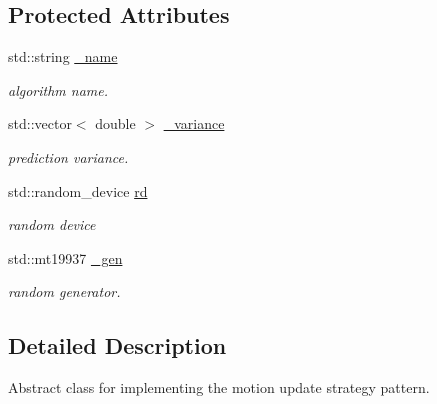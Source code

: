 \subsection*{Protected Attributes}
\begin{DoxyCompactItemize}
\item 
\hypertarget{classMotionUpdate_abbc6aa3b84948633b9f78457a8b8c350}{std\-::string \hyperlink{classMotionUpdate_abbc6aa3b84948633b9f78457a8b8c350}{\-\_\-name}}\label{classMotionUpdate_abbc6aa3b84948633b9f78457a8b8c350}

\begin{DoxyCompactList}\small\item\em algorithm name. \end{DoxyCompactList}\item 
\hypertarget{classMotionUpdate_afd6ec5a2d192392fd23a0d637cce71be}{std\-::vector$<$ double $>$ \hyperlink{classMotionUpdate_afd6ec5a2d192392fd23a0d637cce71be}{\-\_\-variance}}\label{classMotionUpdate_afd6ec5a2d192392fd23a0d637cce71be}

\begin{DoxyCompactList}\small\item\em prediction variance. \end{DoxyCompactList}\item 
\hypertarget{classMotionUpdate_aad51f40e81e60f672035f0a43bb352ad}{std\-::random\-\_\-device \hyperlink{classMotionUpdate_aad51f40e81e60f672035f0a43bb352ad}{rd}}\label{classMotionUpdate_aad51f40e81e60f672035f0a43bb352ad}

\begin{DoxyCompactList}\small\item\em random device \end{DoxyCompactList}\item 
\hypertarget{classMotionUpdate_ae69a23e3978d216c73c296984eb82ad0}{std\-::mt19937 \hyperlink{classMotionUpdate_ae69a23e3978d216c73c296984eb82ad0}{\-\_\-gen}}\label{classMotionUpdate_ae69a23e3978d216c73c296984eb82ad0}

\begin{DoxyCompactList}\small\item\em random generator. \end{DoxyCompactList}\end{DoxyCompactItemize}


\subsection{Detailed Description}
Abstract class for implementing the motion update strategy pattern. 

